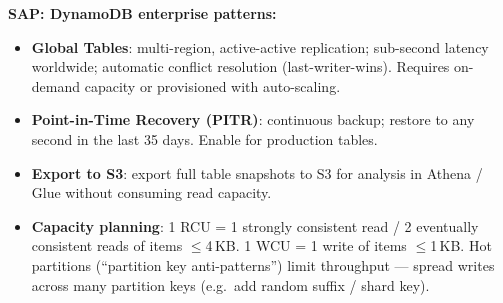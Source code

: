 \begin{sapdepth}
\textbf{SAP: DynamoDB enterprise patterns:}
\begin{itemize}
  \item \textbf{Global Tables}: multi-region, active-active replication; sub-second latency
        worldwide; automatic conflict resolution (last-writer-wins). Requires on-demand capacity
        or provisioned with auto-scaling.
  \item \textbf{Point-in-Time Recovery (PITR)}: continuous backup; restore to any second in
        the last 35 days. Enable for production tables.
  \item \textbf{Export to S3}: export full table snapshots to S3 for analysis in Athena / Glue
        without consuming read capacity.
  \item \textbf{Capacity planning}: 1 RCU = 1 strongly consistent read / 2 eventually consistent
        reads of items $\leq$4\,KB. 1 WCU = 1 write of items $\leq$1\,KB.
        Hot partitions (``partition key anti-patterns'') limit throughput --- spread writes across
        many partition keys (e.g.\ add random suffix / shard key).
\end{itemize}
\end{sapdepth}
